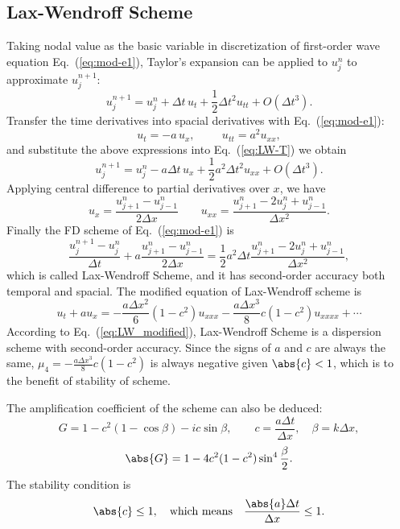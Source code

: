 \documentclass[]{article}
\begin{document}
\subsection{Lax-Wendroff Scheme}
\label{sec:lax-wendroff-scheme}
Taking nodal value as the basic variable in discretization of first-order 
wave equation Eq.~(\ref{eq:mod-e1}), Taylor's expansion can be
applied to $u_j^{n}$ to approximate $u_j^{n+1}$:
\begin{equation}
    u_j^{n+1}=u_j^n+\Delta t\,u_t +\frac{1}{2}\Delta t^2 u_{tt}+O(\Delta t^3).
    \label{eq:LW-T} 
\end{equation}
Transfer the time derivatives into spacial derivatives with
Eq.~(\ref{eq:mod-e1}):
\begin{equation*}
    u_t=-a\, u_x,\hspace{1cm} u_{tt} = a^2 u_{xx},
\end{equation*}
and substitute the above expressions into Eq.~(\ref{eq:LW-T}) we
obtain
\begin{equation}
    u_j^{n+1}=u_j^n-a\Delta t\, u_x +\frac{1}{2}a^2\Delta t^2 u_{xx}+O(\Delta t^3).
    \label{eq:LW-T1} 
\end{equation}
Applying central difference to partial derivatives over $x$, we have
\begin{equation*}
    u_x=\dfrac{u_{j+1}^n-u_{j-1}^n}{2\Delta x} \qquad
    u_{xx}=\dfrac{u_{j+1}^n-2u_j^n+u_{j-1}^n}{\Delta x^2}.
\end{equation*}
Finally the FD scheme of Eq.~(\ref{eq:mod-e1}) is
\begin{equation*}
    \label{eq:LW} \dfrac{u_{j}^{n+1}-u_{j}^n}{\Delta
    t}+a\dfrac{u_{j+1}^n-u_{j-1}^n}{2\Delta x} =\dfrac{1}{2}a^2\Delta
    t\dfrac{u_{j+1}^n-2u_j^n+u_{j-1}^n}{\Delta x^2},
\end{equation*}
which is called Lax-Wendroff Scheme, and it has second-order accuracy
both temporal and spacial. The modified equation of Lax-Wendroff
scheme is
\begin{equation}
    u_t+au_x=-\frac{a\Delta x^2}{6}(1-c^2)u_{xxx} -\frac{a\Delta x^3}{8}c(1-c^2)u_{xxxx}+\cdots
    \label{eq:LW_modified}
\end{equation}
According to Eq.~(\ref{eq:LW_modified}), Lax-Wendroff Scheme is a
dispersion scheme with second-order accuracy. Since the signs of $a$
and $c$ are always the same, $\mu_4=-\frac{a\Delta x^3}{8}c(1-c^2)$ is
always negative given $\abs{c} < 1$, which is to the benefit of
stability of scheme.

The amplification coefficient of the scheme can also be deduced:
\begin{equation}
    G=1-c^2(1-\cos\beta)-ic\sin\beta,\quad\quad
    c=\frac{a\Delta t}{\Delta x},\quad \beta=k\Delta x,
    \label{eq:LWG} 
\end{equation}
\begin{equation}
    \abs{G}=1-4c^2(1-c^2)\sin^4\frac{\beta}{2}.
    \label{eq:LWGA} 
\end{equation}
The stability condition is
\begin{equation}
    \abs{c}\leq 1,\quad\mbox{which means}\quad
    \frac{\abs{a}\Delta t}{\Delta x}\leq 1.
    \label{eq:LWGA1} 
\end{equation}
\end{document}
